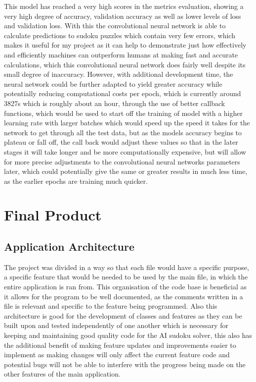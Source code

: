 \documentclass[]{final_report}
\begin{document}
This model has reached a very high scores in the metrics evaluation, showing a very high degree of accuracy, validation accuracy as well as lower levels of loss and validation loss. With this the convolutional neural network is able to calculate predictions to sudoku puzzles which contain very few errors, which makes it useful for my project as it can help to demonstrate just how effectively and efficiently machines can outperform humans at making fast and accurate calculations, which this convolutional neural network does fairly well despite its small degree of inaccuracy. However, with additional development time, the neural network could be further adapted to yield greater accuracy while potentially reducing computational costs per epoch, which is currently around 3827s which is roughly about an hour, through the use of better callback functions, which would be used to start off the training of model with a higher learning rate with larger batches which would speed up the speed it takes for the network to get through all the test data, but as the models accuracy begins to plateau or fall off, the call back would adjust these values so that in the later stages it will take longer and be more computationally expensive, but will allow for more precise adjustments to the convolutional neural networks parameters later, which could potentially give the same or greater results in much less time, as the earlier epochs are training much quicker.

\chapter{Final Product}

\section{Application Architecture}

The project was divided in a way so that each file would have a specific purpose, a specific feature that would be needed to be used by the main file, in which the entire application is ran from. This organisation of the code base is beneficial as it allows for the program to be well documented, as the comments written in a file is relevant and specific to the feature being programmed. Also this architecture is good for the development of classes and features as they can be built upon and tested independently of one another which is necessary for keeping and maintaining good quality code for the AI sudoku solver, this also has the additional benefit of making feature updates and improvements easier to implement as making changes will only affect the current feature code and potential bugs will not be able to interfere with the progress being made on the other features of the main application. 
\end{document}
